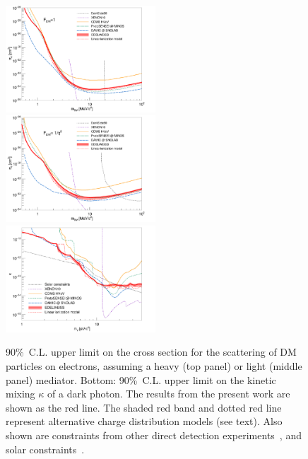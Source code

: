 \documentclass[aps,nofootinbib,floatfix,showpacs,preprintnumbers,twocolumn,superscriptaddress]{revtex4}
\begin{document}
\begin{figure}[htbp]
\includegraphics[width=0.5\textwidth,angle=0]{Figures/F1resultwithD50added.pdf}
\includegraphics[width=0.5\textwidth,angle=0]{Figures/F1Q2resultwithD50added.pdf}
\includegraphics[width=0.5\textwidth,angle=0]{Figures/DPresultwithD50added.pdf}
\caption{
90\%~C.L. upper limit on the cross section for the scattering of DM particles on electrons, assuming a heavy (top panel) or light (middle panel) mediator. Bottom: 90\%~C.L. upper limit on the kinetic mixing $\kappa$ of a dark photon. The results from the present work are shown as the red line. The shaded red band and dotted red line represent alternative charge distribution models (see text). Also shown are constraints from other direct detection experiments~, and solar constraints~.
} 
\label{fig:results}
\end{figure}
\end{document}
